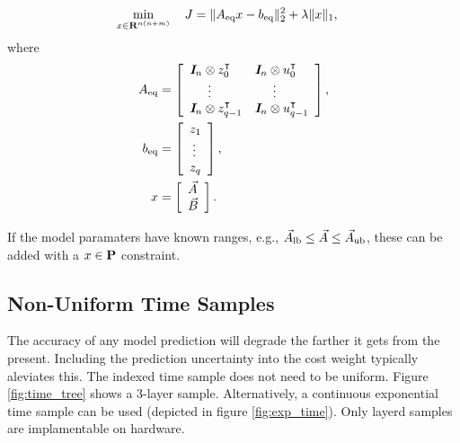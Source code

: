 \documentclass{article}
\begin{document}
    \begin{align*}
        \min_{x\in\textbf{R}^{n(n+m)}}\quad J
        &=
        \|A_{\text{eq}} x-b_{\text{eq}}\|_2^2+\lambda\| x\|_1,
    \end{align*}
    where
    \begin{align*}
        A_{\text{eq}}&= \left[\begin{array}{ll}
            \emph{\textbf{I}}_n\otimes z_0^\intercal & \emph{\textbf{I}}_n\otimes u_0^\intercal\\
            \quad\:\:\vdots&\quad\:\:\vdots\\
            \emph{\textbf{I}}_n\otimes z_{q-1}^\intercal & \emph{\textbf{I}}_n\otimes u_{q-1}^\intercal\\
        \end{array}\right],\\
        b_{\text{eq}}&=
        \left[\begin{array}{l}
            z_1\\
            \:\vdots\\
            z_q
        \end{array}\right],\\
        x &= \left[\begin{array}{l}
            \vec{A}
            \\
            \vec{B}
        \end{array}\right].
    \end{align*} 


    If the model paramaters have known ranges, e.g., 
    $\vec{A}_{\text{lb}}\leq\vec{A}\leq\vec{A}_{\text{ub}}$,
    these can be added with a $x\in\textbf{P}$ constraint.

    \subsection{Non-Uniform Time Samples}

    The accuracy of any model prediction will
    degrade the farther it gets from the present.
    Including the prediction uncertainty into the cost weight typically aleviates this.
    The indexed time sample does not need to be uniform.
    Figure \ref{fig:time_tree} shows a 3-layer sample.  Alternatively,
    a continuous exponential time sample can be used (depicted in figure \ref{fig:exp_time}).
    Only layerd samples are implamentable on hardware.
\end{document}
